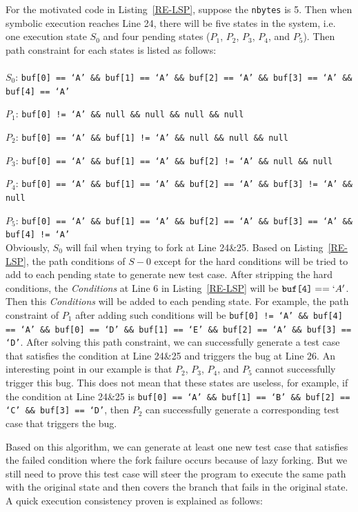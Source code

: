 For the motivated code in Listing~\ref{RE-LSP}, suppose the \texttt{nbytes} is 5. Then when symbolic execution reaches Line 24, there will be five states in the system, i.e. one execution state $S_0$ and four pending states ($P_1$, $P_2$, $P_3$, $P_4$, and $P_5$). 
Then path constraint for each states is listed as follows:
\\
\\
\indent$S_0$: \texttt{buf[0] == `A' \&\& buf[1] == `A' \&\& buf[2] == `A' \&\& buf[3] == `A' \&\& buf[4] == `A'}

$P_1$: \texttt{buf[0] != `A' \&\& null \&\& null  \&\& null  \&\& null}

$P_2$: \texttt{buf[0] == `A' \&\& buf[1] != `A' \&\& null \&\& null  \&\& null}

$P_3$: \texttt{buf[0] == `A' \&\& buf[1] == `A' \&\& buf[2] != `A' \&\& null  \&\& null}

$P_4$: \texttt{buf[0] == `A' \&\& buf[1] == `A' \&\& buf[2] == `A' \&\& buf[3] != `A'  \&\& null}

$P_5$: \texttt{buf[0] == `A' \&\& buf[1] == `A' \&\& buf[2] == `A' \&\& buf[3] == `A'  \&\& buf[4] != `A'}
\\

Obviously, $S_0$ will fail when trying to fork at Line 24\&25. Based on Listing~\ref{RE-LSP}, the path conditions of $S-0$ except for the hard conditions will be tried to add to each pending state to generate new test case. After stripping the hard conditions, the \textit{Conditions} at Line 6 in Listing~\ref{RE-LSP} will be $\texttt{buf[4]} == `A'$. Then this \textit{Conditions} will be added to each pending state. For example, the path constraint of $P_1$ after adding such conditions will be \texttt{buf[0] != `A' \&\& buf[4] == `A' \&\& buf[0] == `D' \&\& buf[1] == `E' \&\& buf[2] == `A' \&\& buf[3] == `D'}. After solving this path constraint, we can successfully generate a test case that satisfies the condition at Line 24\&25 and triggers the bug at Line 26. 
An interesting point in our example is that $P_2$, $P_3$, $P_4$, and $P_5$ cannot successfully trigger this bug. This does not mean that these states are useless, for example, if the condition at Line 24\&25 is \texttt{buf[0] == `A' \&\& buf[1] == `B' \&\& buf[2] == `C' \&\& buf[3] == `D'}, then $P_2$ can successfully generate a corresponding test case that triggers the bug.

Based on this algorithm, we can generate at least one new test case that satisfies the failed condition where the fork failure occurs because of lazy forking. But we still need to prove this test case will steer the program to execute the same path with the original state and then covers the branch that fails in the original state. A quick execution consistency proven is explained as follows:

